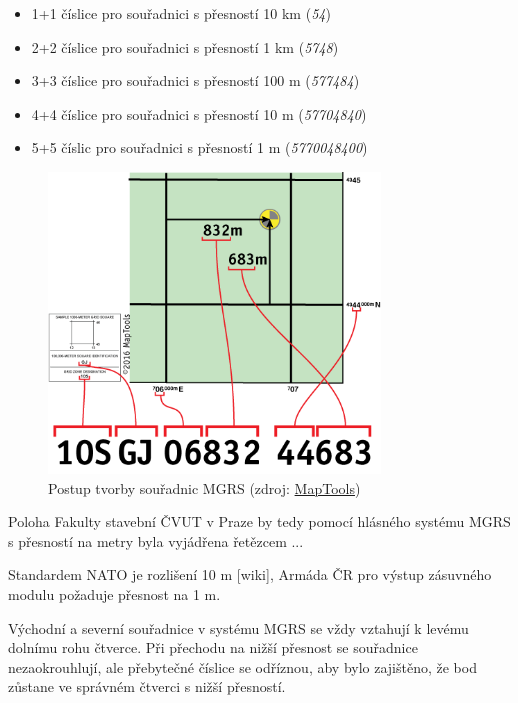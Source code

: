 \begin{itemize}
		\begin{itemize}
				\item 1+1 číslice pro souřadnici s přesností 10 km (\textit{54})
				\item 2+2 číslice pro souřadnici s přesností 1 km (\textit{5748})
				\item 3+3 číslice pro souřadnici s přesností 100 m (\textit{577484})
				\item 4+4 číslice pro souřadnici s přesností 10 m (\textit{57704840})
				\item 5+5 číslic pro souřadnici s přesností 1 m (\textit{5770048400})
		\end{itemize}	
		 
\end{itemize}

\begin{figure}[H]
    \centering
      \includegraphics[width=250pt]{./pictures/MGRS_tvorba.png}
      \caption[Postup tvorby souřadnic MGRS]{Postup tvorby souřadnic MGRS
      (zdroj: \href{https://www.maptools.com/tutorials/mgrs/quick_guide}{MapTools})}
      \label{fig:maptools}
  \end{figure}
  
Poloha Fakulty stavební ČVUT v Praze by tedy pomocí hlásného systému MGRS s přesností na metry byla vyjádřena řetězcem ...

Standardem NATO je rozlišení 10 m [wiki], Armáda ČR pro výstup zásuvného modulu požaduje přesnost na 1 m.

Východní a severní souřadnice v systému MGRS se vždy vztahují k levému dolnímu rohu čtverce. Při přechodu na nižší přesnost se souřadnice nezaokrouhlují, ale přebytečné číslice se odříznou, aby bylo zajištěno, že bod zůstane ve správném čtverci s nižší přesností.




